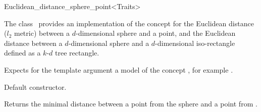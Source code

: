 

\begin{ccRefClass}{Euclidean_distance_sphere_point<Traits>}  %


\ccDefinition
  
The class \ccRefName\ provides an implementation of the
 concept for the Euclidean distance ($l_2$
metric) between a $d$-dimensional sphere and a point, and the
Euclidean distance between a $d$-dimensional sphere and a
$d$-dimensional iso-rectangle defined as a $k$-$d$ tree rectangle.



\ccParameters
Expects for the template argument a model of the concept , 
for example .


\ccIsModel


\ccTypes



\ccCreation
{}  %


{Default constructor.}

\ccOperations


{Returns the minimal distance between a point from the sphere  and a point from
.}


\end{ccRefClass}
